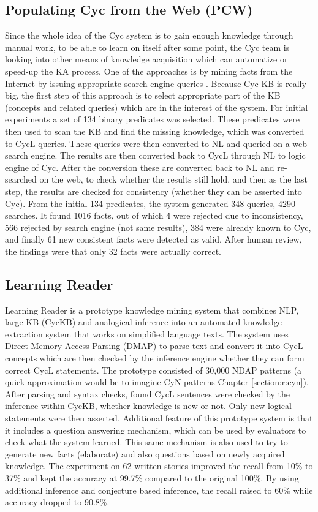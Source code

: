 \subsection{Populating Cyc from the Web (PCW)}
\label{section:r:pcw}
Since the whole idea of the Cyc system is to gain enough knowledge through manual
work, to be able to learn on itself after some point, the Cyc team is looking
into other means of knowledge acquisition which can automatize or speed-up the
KA process. One of the approaches is by mining facts from the Internet by
issuing appropriate search engine queries \parencite{Matuszek2004}. Because Cyc
KB is really big, the first step of this approach is to select appropriate part
of the KB (concepts and related queries) which are in the interest of the 
system. For initial experiments  a set of 134 binary predicates was selected.
These predicates were then used to scan the KB and find the missing knowledge,
which was converted to CycL queries. 
These queries were then converted to NL and queried on a web search engine. 
The results are then converted back to CycL through NL to logic engine of Cyc. 
After the conversion these are converted back to NL and re-searched on the web,
to check whether the results still hold, and then as the last step, the 
results are checked for consistency (whether they can be asserted into Cyc). 
From the initial 134 predicates, the system generated 348 queries, 
4290 searches. It found 1016 facts, out of which 4 were rejected
due to inconsistency, 566 rejected by search engine (not same results), 384 
were already known to Cyc, and finally 61 new consistent facts were detected 
as valid. After human review, the findings were that only 32 facts were 
actually correct.

\subsection{Learning Reader}
\label{section:r:lr}
Learning Reader \parencite{Forbus2007} is a prototype knowledge mining system
that combines NLP, large KB (CycKB) and analogical inference into an automated 
knowledge extraction system that works on simplified language texts. The system
uses Direct Memory Access Parsing (DMAP\parencite{Martin1986}) to parse text
and convert it into CycL concepts which are then checked by the inference engine
whether they can form correct CycL statements. The prototype consisted of
30,000 NDAP patterns (a quick approximation would be to imagine CyN patterns
Chapter \ref{section:r:cyn}). After parsing and syntax checks, found CycL 
sentences were checked by the inference within CycKB, whether knowledge is new
or not. Only new logical statements were then asserted. Additional feature of
this prototype system is that it includes a question answering mechanism, which 
can be used by evaluators to check what the system learned. This same mechanism
is also used to try to generate new facts (elaborate) and also questions based
on newly acquired knowledge. The experiment on 62 written stories improved the
recall from 10\% to 37\% and kept the accuracy at 99.7\% compared to the original 
100\%. By using additional inference and conjecture based inference, the recall
raised to 60\% while accuracy dropped to 90.8\%.

